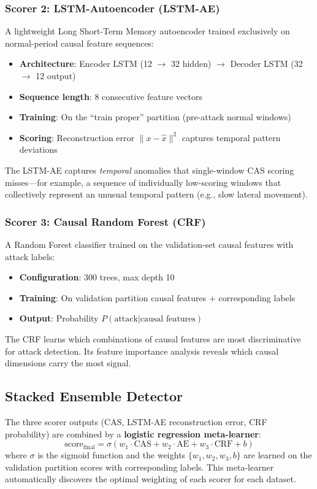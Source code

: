\subsubsection{Scorer 2: LSTM-Autoencoder (LSTM-AE)}
A lightweight Long Short-Term Memory autoencoder trained exclusively on normal-period causal feature sequences:
\begin{itemize}
\item \textbf{Architecture}: Encoder LSTM (12 $\to$ 32 hidden) $\to$ Decoder LSTM (32 $\to$ 12 output)
\item \textbf{Sequence length}: 8 consecutive feature vectors
\item \textbf{Training}: On the ``train proper'' partition (pre-attack normal windows)
\item \textbf{Scoring}: Reconstruction error $\|x - \hat{x}\|^2$ captures temporal pattern deviations
\end{itemize}

The LSTM-AE captures \emph{temporal} anomalies that single-window CAS scoring misses---for example, a sequence of individually low-scoring windows that collectively represent an unusual temporal pattern (e.g., slow lateral movement).

\subsubsection{Scorer 3: Causal Random Forest (CRF)}
A Random Forest classifier trained on the validation-set causal features with attack labels:
\begin{itemize}
\item \textbf{Configuration}: 300 trees, max depth 10
\item \textbf{Training}: On validation partition causal features + corresponding labels
\item \textbf{Output}: Probability $P(\text{attack} | \text{causal features})$
\end{itemize}

The CRF learns which combinations of causal features are most discriminative for attack detection. Its feature importance analysis reveals which causal dimensions carry the most signal.

\subsection{Stacked Ensemble Detector}

The three scorer outputs (CAS, LSTM-AE reconstruction error, CRF probability) are combined by a \textbf{logistic regression meta-learner}:
\begin{equation}
\text{score}_{\text{final}} = \sigma(w_1 \cdot \text{CAS} + w_2 \cdot \text{AE} + w_3 \cdot \text{CRF} + b)
\end{equation}
where $\sigma$ is the sigmoid function and the weights $\{w_1, w_2, w_3, b\}$ are learned on the validation partition scores with corresponding labels. This meta-learner automatically discovers the optimal weighting of each scorer for each dataset.


